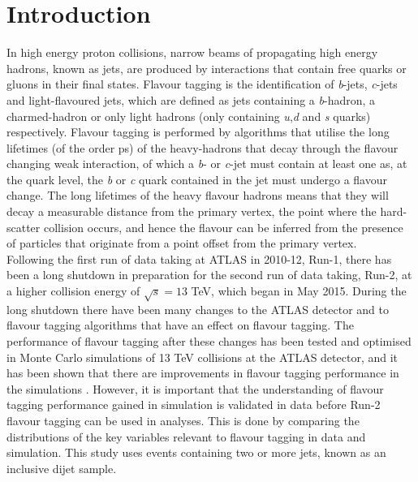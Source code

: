 \documentclass[12pt, onecolumn,notitlepage]{article}
\begin{document}

\section*{Introduction} \label{s_Intro}

In high energy proton collisions, narrow beams of propagating high energy hadrons, known as  jets,  are produced by interactions that 
contain free quarks or gluons in their final states. 
Flavour tagging is the identification of \textit{b}-jets, \textit{c}-jets and light-flavoured jets, which are defined as jets containing a \textit{b}-hadron, 
a charmed-hadron or only light hadrons (only containing \textit{u},\textit{d} and \textit{s} quarks) respectively.
Flavour tagging is performed by algorithms that utilise the long lifetimes (of the order ps) of the heavy-hadrons that decay through the flavour changing weak interaction,
of which a \textit{b}- or \textit{c}-jet must contain at least one as, 
at the quark level, the \textit{b} or \textit{c} quark contained in the jet must undergo a flavour change.
The long lifetimes of the heavy flavour hadrons means that they will decay a measurable distance from the 
primary vertex, the point where the hard-scatter collision occurs, and hence the flavour can be inferred from the presence of particles 
that originate from a point offset from the primary vertex. \\

Following the first run of data taking at ATLAS in 2010-12, Run-1, there has been a long shutdown in preparation for the second run of data taking, Run-2, 
at a higher collision energy of $\sqrt{s} = 13$ TeV, which began in May 2015.
During the long shutdown there have been many changes to the ATLAS detector and to flavour tagging algorithms that have an effect on flavour tagging. 
The performance of flavour tagging after these changes has been tested and optimised in Monte Carlo simulations of 13 TeV collisions at the ATLAS detector,
and it has been shown that there are improvements in flavour tagging performance in the simulations \cite{bib_Run2_perf}.
However, it is important that the understanding of flavour tagging performance gained in simulation is validated in data before Run-2 flavour tagging can 
be used in analyses. 
This is done by comparing the distributions of the key variables relevant to flavour tagging in data and simulation. 
This study uses events containing two or more jets, known as an inclusive dijet sample. \\
\end{document}
